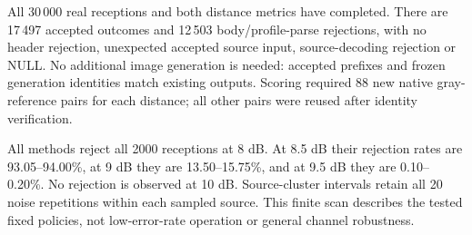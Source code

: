 \documentclass[10pt,letterpaper]{article}
\begin{document}
All 30\,000 real receptions and both distance metrics have completed. There are 17\,497 accepted outcomes and 12\,503 body/profile-parse rejections, with no header rejection, unexpected accepted source input, source-decoding rejection or NULL. No additional image generation is needed: accepted prefixes and frozen generation identities match existing outputs. Scoring required 88 new native gray-reference pairs for each distance; all other pairs were reused after identity verification.

All methods reject all 2000 receptions at 8 dB. At 8.5 dB their rejection rates are 93.05--94.00\%, at 9 dB they are 13.50--15.75\%, and at 9.5 dB they are 0.10--0.20\%. No rejection is observed at 10 dB. Source-cluster intervals retain all 20 noise repetitions within each sampled source. This finite scan describes the tested fixed policies, not low-error-rate operation or general channel robustness.
\end{document}
